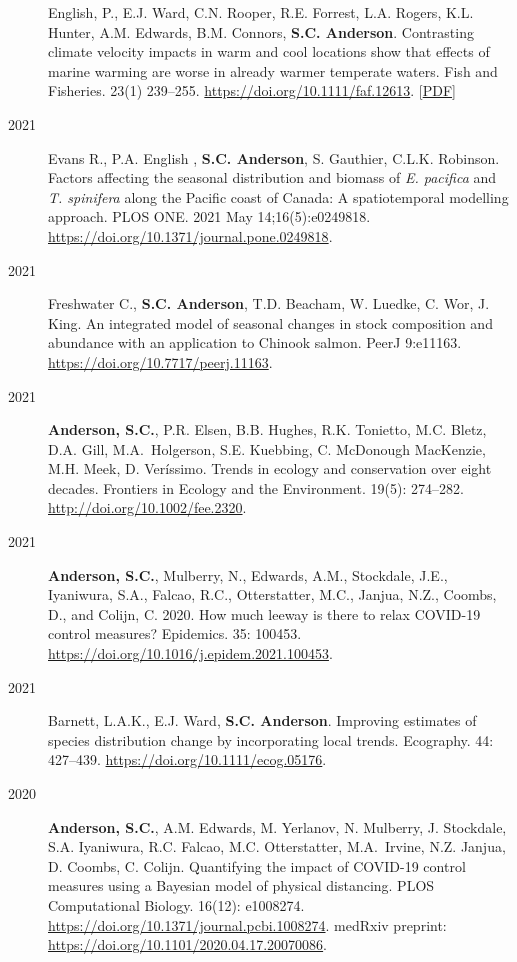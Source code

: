 \begin{description}
English, P., E.J. Ward, C.N. Rooper, R.E. Forrest, L.A. Rogers, K.L.
Hunter, A.M. Edwards, B.M. Connors, \textbf{S.C. Anderson}. Contrasting
climate velocity impacts in warm and cool locations show that effects of
marine warming are worse in already warmer temperate waters. Fish and
Fisheries. 23(1) 239--255. \url{https://doi.org/10.1111/faf.12613}.
{[}\href{https://www.dropbox.com/s/cmkzlxgiez6rzc0/English_etal_2022_contrasting_climate_velocity.pdf?dl=1}{PDF}{]}
\item[2021]
Evans R., P.A. English , \textbf{S.C. Anderson}, S. Gauthier, C.L.K.
Robinson. Factors affecting the seasonal distribution and biomass of
\emph{E. pacifica} and \emph{T. spinifera} along the Pacific coast of
Canada: A spatiotemporal modelling approach. PLOS ONE. 2021 May
14;16(5):e0249818. \url{https://doi.org/10.1371/journal.pone.0249818}.
\item[2021]
Freshwater C., \textbf{S.C. Anderson}, T.D. Beacham, W. Luedke, C. Wor,
J. King. An integrated model of seasonal changes in stock composition
and abundance with an application to Chinook salmon. PeerJ 9:e11163.
\url{https://doi.org/10.7717/peerj.11163}.
\item[2021]
\textbf{Anderson, S.C.}, P.R. Elsen, B.B. Hughes, R.K. Tonietto, M.C.
Bletz, D.A. Gill, M.A.\ Holgerson, S.E. Kuebbing, C. McDonough MacKenzie,
M.H. Meek, D. Veríssimo. Trends in ecology and conservation over eight
decades. Frontiers in Ecology and the Environment. 19(5): 274--282.
\url{http://doi.org/10.1002/fee.2320}.
\item[2021]
\textbf{Anderson, S.C.}, Mulberry, N., Edwards, A.M., Stockdale, J.E.,
Iyaniwura, S.A., Falcao, R.C., Otterstatter, M.C., Janjua, N.Z., Coombs,
D., and Colijn, C. 2020. How much leeway is there to relax COVID-19
control measures? Epidemics. 35: 100453.
\url{https://doi.org/10.1016/j.epidem.2021.100453}.
\item[2021]
Barnett, L.A.K., E.J. Ward, \textbf{S.C. Anderson}. Improving estimates
of species distribution change by incorporating local trends. Ecography.
44: 427--439. \url{https://doi.org/10.1111/ecog.05176}.
\item[2020]
\textbf{Anderson, S.C.}, A.M. Edwards, M. Yerlanov, N. Mulberry, J.
Stockdale, S.A. Iyaniwura, R.C. Falcao, M.C. Otterstatter, M.A.\ Irvine,
N.Z. Janjua, D. Coombs, C. Colijn. Quantifying the impact of COVID-19
control measures using a Bayesian model of physical distancing. PLOS
Computational Biology. 16(12): e1008274.
\url{https://doi.org/10.1371/journal.pcbi.1008274}. medRxiv preprint:
\url{https://doi.org/10.1101/2020.04.17.20070086}.

\end{description}
